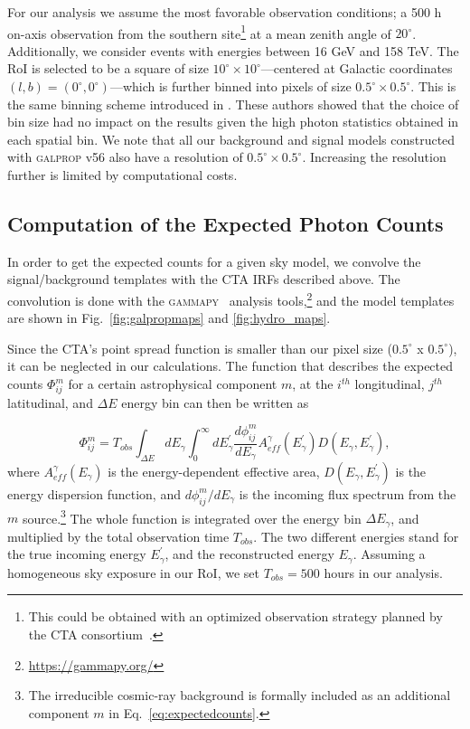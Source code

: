 \documentclass[doublespace,nopageskip]{VTthesis}
\begin{document}
For our analysis we assume the most favorable observation conditions; a 500 h on-axis observation from the southern site\footnote{This could be obtained with an optimized observation strategy planned by the CTA consortium~\citep{2021JCAP...01..057A}.} at a mean zenith angle of $20^\circ$. Additionally, we consider events with energies between 16 GeV and 158 TeV. The RoI is selected to be a square of size $10^\circ \times 10^\circ$---centered at Galactic coordinates $(l,b)=(0^\circ, 0^\circ)$---which is further binned into pixels of size $0.5^\circ \times 0.5^\circ$. This is the same binning scheme introduced in \cite{2021PhRvD.103b3011R}. These authors showed that the choice of bin size had no impact on the results given the high photon statistics obtained in each spatial bin. We note that all our background and signal models constructed with \textsc{galprop} v56 also have a resolution of $0.5^\circ \times 0.5^\circ$. Increasing the resolution further is limited by computational costs.  

\subsection{Computation of the Expected Photon Counts }
\label{subsec:expectedcounts}

In order to get the expected counts for a given sky model, we convolve the signal/background templates with the CTA IRFs described above. The convolution is done with the \textsc{gammapy}~\citep{2017ICRC...35..766D,2019A&A...625A..10N} analysis tools,\footnote{\url{https://gammapy.org/}} and the model templates are shown in Fig.~\ref{fig:galpropmaps} and \ref{fig:hydro_maps}.

Since the CTA's point spread function is smaller than our pixel size ($0.5^{\circ} $ x $ 0.5^{\circ}$), it can be neglected in our calculations. The function that describes the expected counts $\Phi^m_{ij}$ for a certain astrophysical component $m$, at the $i^{th}$ longitudinal, $j^{th}$ latitudinal, and $\Delta E$ energy bin can then be written as

\begin{equation}\label{eq:expectedcounts}
    \Phi^m_{ij} = T_{obs} \int_{\Delta E} dE_{\gamma} \int_{0}^{\infty} dE^{'}_{\gamma}  \frac{d\phi^{m}_{ij}}{dE_{\gamma}} A^{\gamma}_{eff}(E^{'}_{\gamma}) D(E_{\gamma},E_{\gamma}^{'}),
\end{equation} 
where $A^{\gamma}_{eff}(E_\gamma)$ is the energy-dependent effective area, $D(E_{\gamma},E_{\gamma}^{'})$ is the energy dispersion function, and $d\phi^{m}_{ij}/dE_{\gamma}$ is the incoming flux spectrum from the $m$ source.\footnote{The irreducible cosmic-ray background is formally included as an additional component $m$ in Eq.~\ref{eq:expectedcounts}.} The whole function is integrated over the energy bin $\Delta E_{\gamma}$, and multiplied by the total observation time $T_{obs}$. The two different energies stand for the true incoming energy $E_{\gamma}^{'}$, and the reconstructed energy $E_{\gamma}$. Assuming a homogeneous sky exposure in our RoI, we set $T_{obs}=500$ hours in our analysis. 
\end{document}
